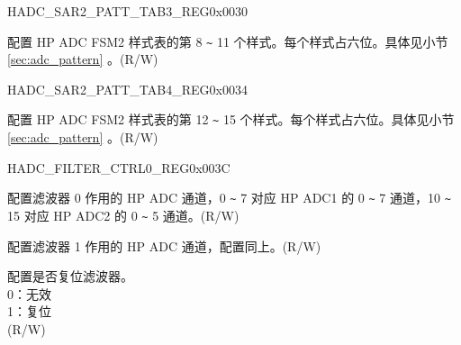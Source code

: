 \begin{register}{H}{ADC\_SAR2\_PATT\_TAB3\_REG}{0x0030}\label{regdesc:ADCSAR2PATTTAB3REG}
%
%
\regnewline%
\begin{regdesc}\begin{reglist}
\label{fielddesc:ADCSAR2PATTTAB3}\item [ADC\_SAR2\_PATT\_TAB3] 配置 HP ADC FSM2 样式表的第 8 \verb+~+ 11 个样式。每个样式占六位。具体见小节 \ref{sec:adc_pattern} \textit{}。(R/W)
\end{reglist}\end{regdesc}
\end{register}


\begin{register}{H}{ADC\_SAR2\_PATT\_TAB4\_REG}{0x0034}\label{regdesc:ADCSAR2PATTTAB4REG}
%
%
\regnewline%
\begin{regdesc}\begin{reglist}
\label{fielddesc:ADCSAR2PATTTAB4}\item [ADC\_SAR2\_PATT\_TAB4] 配置 HP ADC FSM2 样式表的第 12 \verb+~+ 15 个样式。每个样式占六位。具体见小节 \ref{sec:adc_pattern} \textit{}。(R/W)
\end{reglist}\end{regdesc}
\end{register}


\begin{register}{H}{ADC\_FILTER\_CTRL0\_REG}{0x003C}\label{regdesc:ADCFILTERCTRL0REG}
%
%
%
%
%
\regnewline%
\begin{regdesc}\begin{reglist}
\label{fielddesc:ADCFILTERCHANNEL1}\item [ADC\_FILTER\_CHANNEL0] 配置滤波器 0 作用的 HP ADC 通道，0 \verb+~+ 7 对应 HP ADC1 的 0 \verb+~+ 7 通道，10 \verb+~+ 15 对应 HP ADC2 的 0 \verb+~+ 5 通道。(R/W)
\label{fielddesc:ADCFILTERCHANNEL0}\item [ADC\_FILTER\_CHANNEL1] 配置滤波器 1 作用的 HP ADC 通道，配置同上。(R/W)
\label{fielddesc:ADCFILTERRESET}\item [ADC\_FILTER\_RESET] 配置是否复位滤波器。\\
0：无效\\
1：复位\\
(R/W)
\end{reglist}\end{regdesc}
\end{register}




